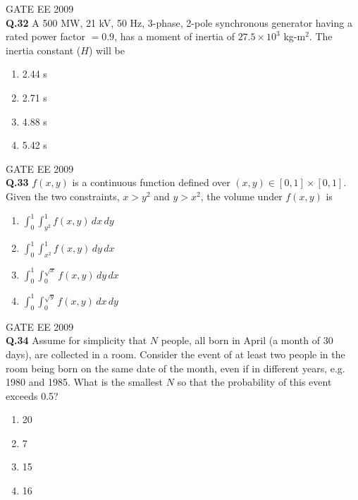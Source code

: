 \documentclass[12pt]{article}
\begin{document}
\vspace{1cm}

\vspace{0.5cm}
\hspace{10pt}
GATE EE 2009\\
\noindent\textbf{Q.32} A 500 MW, 21 kV, 50 Hz, 3-phase, 2-pole synchronous generator having a rated power factor $= 0.9$, has a moment of inertia of $27.5 \times 10^{3}$ kg-m$^{2}$. The inertia constant ($H$) will be

\begin{enumerate}
    \item 2.44 s
    \item 2.71 s
    \item 4.88 s
    \item 5.42 s
\end{enumerate}

\vspace{0.5cm}
\hspace{10pt}
GATE EE 2009\\
\noindent\textbf{Q.33} $f(x, y)$ is a continuous function defined over $(x,y) \in [0,1]\times[0,1]$. Given the two constraints, $x > y^{2}$ and $y > x^{2}$, the volume under $f(x,y)$ is

\begin{enumerate}
    \item $\displaystyle \int_{0}^{1} \int_{y^{2}}^{1} f(x,y) \, dx \, dy$
    \item $\displaystyle \int_{0}^{1} \int_{x^{2}}^{1} f(x,y) \, dy \, dx$
    \item $\displaystyle \int_{0}^{1} \int_{0}^{\sqrt{x}} f(x,y) \, dy \, dx$
    \item $\displaystyle \int_{0}^{1} \int_{0}^{\sqrt{y}} f(x,y) \, dx \, dy$
\end{enumerate}

\vspace{0.5cm}
\hspace{10pt}
GATE EE 2009\\
\noindent\textbf{Q.34} Assume for simplicity that $N$ people, all born in April (a month of 30 days), are collected in a room. Consider the event of at least two people in the room being born on the same date of the month, even if in different years, e.g. 1980 and 1985. What is the smallest $N$ so that the probability of this event exceeds 0.5?

\begin{enumerate}
    \item 20
    \item 7
    \item 15
    \item 16
\end{enumerate}
\end{document}
